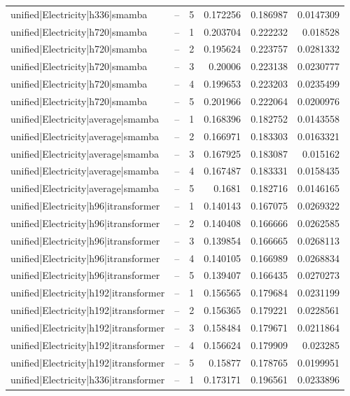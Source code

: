 \begin{longtable}{llrrrr}
unified|Electricity|h336|smamba & -- & 5 & 0.172256 & 0.186987 & 0.0147309 \\
unified|Electricity|h720|smamba & -- & 1 & 0.203704 & 0.222232 & 0.018528 \\
unified|Electricity|h720|smamba & -- & 2 & 0.195624 & 0.223757 & 0.0281332 \\
unified|Electricity|h720|smamba & -- & 3 & 0.20006 & 0.223138 & 0.0230777 \\
unified|Electricity|h720|smamba & -- & 4 & 0.199653 & 0.223203 & 0.0235499 \\
unified|Electricity|h720|smamba & -- & 5 & 0.201966 & 0.222064 & 0.0200976 \\
unified|Electricity|average|smamba & -- & 1 & 0.168396 & 0.182752 & 0.0143558 \\
unified|Electricity|average|smamba & -- & 2 & 0.166971 & 0.183303 & 0.0163321 \\
unified|Electricity|average|smamba & -- & 3 & 0.167925 & 0.183087 & 0.015162 \\
unified|Electricity|average|smamba & -- & 4 & 0.167487 & 0.183331 & 0.0158435 \\
unified|Electricity|average|smamba & -- & 5 & 0.1681 & 0.182716 & 0.0146165 \\
unified|Electricity|h96|itransformer & -- & 1 & 0.140143 & 0.167075 & 0.0269322 \\
unified|Electricity|h96|itransformer & -- & 2 & 0.140408 & 0.166666 & 0.0262585 \\
unified|Electricity|h96|itransformer & -- & 3 & 0.139854 & 0.166665 & 0.0268113 \\
unified|Electricity|h96|itransformer & -- & 4 & 0.140105 & 0.166989 & 0.0268834 \\
unified|Electricity|h96|itransformer & -- & 5 & 0.139407 & 0.166435 & 0.0270273 \\
unified|Electricity|h192|itransformer & -- & 1 & 0.156565 & 0.179684 & 0.0231199 \\
unified|Electricity|h192|itransformer & -- & 2 & 0.156365 & 0.179221 & 0.0228561 \\
unified|Electricity|h192|itransformer & -- & 3 & 0.158484 & 0.179671 & 0.0211864 \\
unified|Electricity|h192|itransformer & -- & 4 & 0.156624 & 0.179909 & 0.023285 \\
unified|Electricity|h192|itransformer & -- & 5 & 0.15877 & 0.178765 & 0.0199951 \\
unified|Electricity|h336|itransformer & -- & 1 & 0.173171 & 0.196561 & 0.0233896 \\

\end{longtable}
